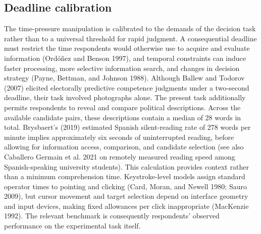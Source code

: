 \documentclass[11pt]{article}\usepackage[]{graphicx}\usepackage[]{xcolor}
\begin{document}
\subsection{Deadline calibration}

The time-pressure manipulation is calibrated to the demands of the decision task rather than to a universal threshold for rapid judgment. A consequential deadline must restrict the time respondents would otherwise use to acquire and evaluate information (Ord\'o\~nez and Benson 1997), and temporal constraints can induce faster processing, more selective information search, and changes in decision strategy (Payne, Bettman, and Johnson 1988). Although Ballew and Todorov (2007) elicited electorally predictive competence judgments under a two-second deadline, their task involved photographs alone. The present task additionally permits respondents to reveal and compare political descriptions. Across the available candidate pairs, these descriptions contain a median of 28 words in total. Brysbaert's (2019) estimated Spanish silent-reading rate of 278 words per minute implies approximately six seconds of uninterrupted reading, before allowing for information access, comparison, and candidate selection (see also Caballero Germain et al. 2021 on remotely measured reading speed among Spanish-speaking university students). This calculation provides context rather than a minimum comprehension time. Keystroke-level models assign standard operator times to pointing and clicking (Card, Moran, and Newell 1980; Sauro 2009), but cursor movement and target selection depend on interface geometry and input devices, making fixed allowances per click inappropriate (MacKenzie 1992). The relevant benchmark is consequently respondents' observed performance on the experimental task itself.
\end{document}
